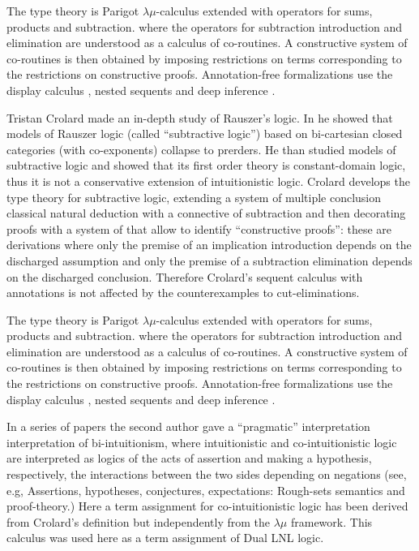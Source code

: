 {The type theory is Parigot $\lambda\mu$-calculus extended with operators for sums, products and subtraction. 
where the operators for subtraction introduction and elimination are understood as a calculus of co-routines.
A constructive system of co-routines is then obtained by imposing restrictions on terms corresponding to the restrictions
 on constructive proofs.  Annotation-free formalizations use the display calculus \cite{Gore:2000}, nested sequents
\cite{GorePostnieceTiu:2008} and deep inference \cite{Postniece:2009}.

Tristan Crolard \cite{Crolard:2001,Crolard:2004} made an in-depth
study of Rauszer's logic. In \cite{Crolard:2001} he showed that models
of Rauszer logic (called ``subtractive logic'') based on bi-cartesian
closed categories (with co-exponents) collapse to prerders.  He than
studied models of subtractive logic and showed that its first order
theory is constant-domain logic, thus it is not a conservative
extension of intuitionistic logic.  Crolard \cite{Crolard:2004}
develops the type theory for subtractive logic, extending a system of
multiple conclusion classical natural deduction with a connective of
subtraction and then decorating proofs with a system of
\cite{annotationsofdependencies} that allow to identify ``constructive
proofs'': these are derivations where only the premise of an
implication introduction depends on the discharged assumption and only
the premise of a subtraction elimination depends on the discharged
conclusion. Therefore Crolard's sequent calculus with annotations is
not affected by the counterexamples to cut-eliminations.

The type theory is Parigot $\lambda\mu$-calculus extended with
operators for sums, products and subtraction.  where the operators for
subtraction introduction and elimination are understood as a calculus
of co-routines.  A constructive system of co-routines is then obtained
by imposing restrictions on terms corresponding to the restrictions on
constructive proofs.  Annotation-free formalizations use the display
calculus \cite{Gore:2000}, nested sequents \cite{GorePostnieceTiu:2008}
and deep inference \cite{Postniece:2009}.

In a series of papers the second author gave a ``pragmatic''
interpretation interpretation of bi-intuitionism, where intuitionistic
and co-intuitionistic logic are interpreted as logics of the acts of
assertion and making a hypothesis, respectively, the interactions
between the two sides depending on negations (see, e.g,
\cite{Bellin:2014} Assertions, hypotheses, conjectures, expectations:
Rough-sets semantics and proof-theory.)  Here a term assignment for
co-intuitionistic logic has been derived from Crolard's definition but
independently from the $\lambda\mu$ framework. This calculus was used
here as a term assignment of Dual LNL logic.


}
